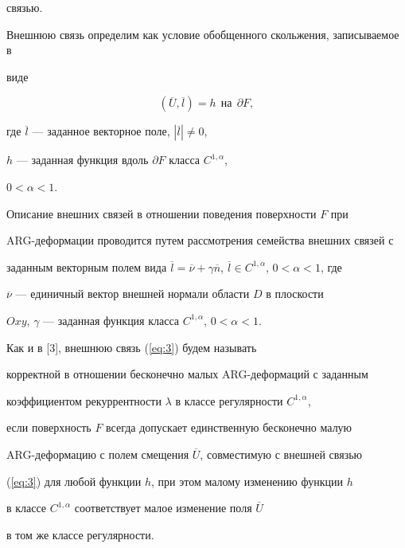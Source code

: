 связью.





Внешнюю связь определим как условие обобщенного скольжения, записываемое в 


виде


\begin{equation}\label{eq:3}


({\overline U ,\overline l })=h\ \ \text{на}\ \ \partial F,


\end{equation}


где $\overline l $ --- заданное векторное поле, $ | {\overline l } | \ne 0$,


$h$ --- заданная функция вдоль $\partial F$ класса $C^{1,\alpha }$, 


$0 < \alpha < 1$.





Описание внешних связей в отношении поведения поверхности $F$ при 


ARG-деформации проводится путем рассмотрения семейства внешних связей с 


заданным векторным полем вида $\overline l=\overline \nu+\gamma 


\overline {n}$, $\overline l \in C^{1,\alpha }$, $0 < \alpha < 1$, где 


$\overline \nu$ --- единичный вектор внешней нормали области $D$ в плоскости


$Oxy$, $\gamma$ --- заданная функция класса $C^{1,\alpha }$, $0 < \alpha < 1$.





Как и в [3], внешнюю связь (\ref{eq:3}) будем называть 


корректной в отношении бесконечно малых ARG-деформаций с заданным 


коэффициентом рекуррентности $\lambda$ в классе регулярности $C^{1,\alpha }$,


если поверхность $F$ всегда допускает единственную бесконечно малую 


ARG-деформацию с полем смещения $\overline U$, совместимую с внешней связью 


(\ref{eq:3}) для любой функции $h$, при этом малому изменению функции $h$


в классе $C^{1,\alpha }$ соответствует малое изменение поля $\overline U$


в том же классе регулярности.





